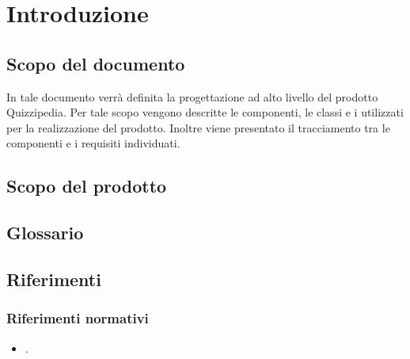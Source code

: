 \documentclass[a4paper, titlepage]{article}
\begin{document}
\pagestyle{fancy}	

\maketitle



\newpage
\tableofcontents

\newpage
\listoffigures \label{lastromanpage}

\newpage
\clearpage	
{}
\hypersetup{linkcolor=blue}

\section{Introduzione}
\subsection{Scopo del documento}
In tale documento verrà definita la progettazione ad alto livello del prodotto Quizzipedia.
Per tale scopo vengono descritte le componenti, le classi e i  utilizzati per la realizzazione del prodotto. Inoltre viene presentato il tracciamento tra le componenti e i requisiti individuati.

\subsection{Scopo del prodotto}
\SCOPO

\subsection{Glossario}
\GLOSSARIO

\subsection{Riferimenti}
\subsubsection{Riferimenti normativi}
\begin{itemize}
\item {} \NdPdoc.
\end{itemize}
\end{document}
